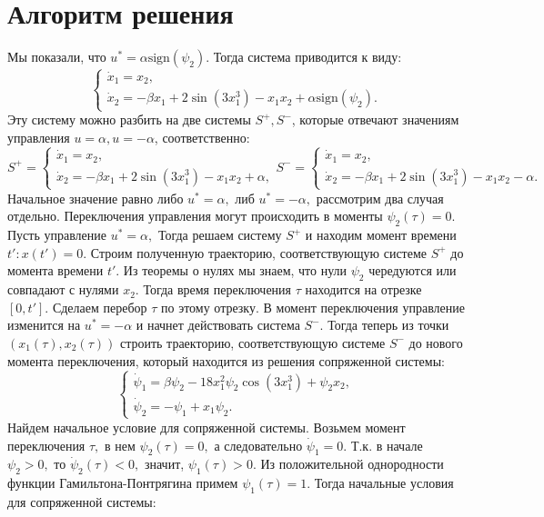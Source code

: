 \documentclass{article}
\begin{document}
\section{Алгоритм решения}
Мы показали, что $u^* = \alpha\text{sign}(\psi_2).$ Тогда система приводится к виду:
$$
\begin{cases}
    \dot{x}_1 = x_2,\\
    \dot{x}_2 = -\beta x_1 + 2\sin(3x_1^3)-x_1x_2+\alpha\text{sign}(\psi_2).
\end{cases}
$$
Эту систему можно разбить на две системы $S^+, S^-$, которые отвечают значениям управления $u = \alpha, u = -\alpha$, соответственно:
$$
S^+ = 
\begin{cases}
    \dot{x}_1 = x_2,\\
    \dot{x}_2 = -\beta x_1 + 2\sin(3x_1^3)-x_1x_2+\alpha,
\end{cases}
S^- = 
\begin{cases}
    \dot{x}_1 = x_2,\\
    \dot{x}_2 = -\beta x_1 + 2\sin(3x_1^3)-x_1x_2-\alpha.
\end{cases}
$$
Начальное значение равно либо $u^* = \alpha, $ либ $u^* = -\alpha,$ рассмотрим два случая отдельно. Переключения управления могут происходить в моменты $\psi_2(\tau) = 0.$\\
Пусть управление $u^* = \alpha,$ Тогда решаем систему $S^+$ и находим момент времени $t': x(t')= 0.$ Строим полученную траекторию, соответствующую системе $S^+$ до момента времени $t'.$ Из теоремы о нулях мы знаем, что нули $\psi_2$ чередуются или совпадают с нулями $x_2.$ Тогда время переключения $\tau$ находится на отрезке $[0, t'].$ Сделаем перебор $\tau$ по этому отрезку. В момент переключения управление изменится на $u^* = -\alpha$ и начнет действовать система $S^-$. Тогда теперь из точки $(x_1(\tau), x_2(\tau))$ строить траекторию, соответствующую системе $S^-$ до нового момента переключения, который находится из решения сопряженной системы:
$$
\begin{cases}
    \dot{\psi}_1 = \beta \psi_2 - 18x_1^2\psi_2\cos(3x_1^3) + \psi_2 x_2,\\
    \dot{\psi}_2 = -\psi_1 + x_1\psi_2.
\end{cases}
$$
Найдем начальное условие для сопряженной системы. Возьмем момент переключения $\tau,$ в нем $\psi_2(\tau) = 0,$ а следовательно $\dot{\psi}_1 =0.$ Т.к. в начале $\psi_2>0,$ то $\dot{\psi}_2(\tau)<0,$ значит, $\psi_1(\tau) >0.$ Из положительной однородности функции Гамильтона-Понтрягина примем $\psi_1(\tau)=1.$ Тогда начальные условия для сопряженной системы:
\end{document}
